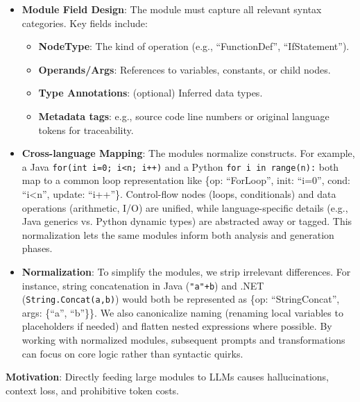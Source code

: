 \documentclass[twocolumn]{article}
\begin{document}
\begin{itemize}
    \item \textbf{Module Field Design}: The module must capture all relevant syntax categories. Key fields include:
    \begin{itemize}
        \item \textbf{NodeType}: The kind of operation (e.g., ``FunctionDef'', ``IfStatement'').
        \item \textbf{Operands/Args}: References to variables, constants, or child nodes.
        \item \textbf{Type Annotations}: (optional) Inferred data types.
        \item \textbf{Metadata tags}: e.g., source code line numbers or original language tokens for traceability.
    \end{itemize}

    \item \textbf{Cross-language Mapping}: The modules normalize constructs. For example, a Java \texttt{for(int i=0; i<n; i++)} and a Python \texttt{for i in range(n):} both map to a common loop representation like \{op: ``ForLoop'', init: ``i=0'', cond: ``i<n'', update: ``i++''\}. Control-flow nodes (loops, conditionals) and data operations (arithmetic, I/O) are unified, while language-specific details (e.g., Java generics vs. Python dynamic types) are abstracted away or tagged. This normalization lets the same modules inform both analysis and generation phases.

    \item \textbf{Normalization}: To simplify the modules, we strip irrelevant differences. For instance, string concatenation in Java (\texttt{"a"+b}) and .NET (\texttt{String.Concat(a,b)}) would both be represented as \{op: ``StringConcat'', args: \{``a'', ``b''\}\}. We also canonicalize naming (renaming local variables to placeholders if needed) and flatten nested expressions where possible. By working with normalized modules, subsequent prompts and transformations can focus on core logic rather than syntactic quirks.
\end{itemize}

\textbf{Motivation}: Directly feeding large modules to LLMs causes hallucinations, context loss, and prohibitive token costs.
\end{document}
